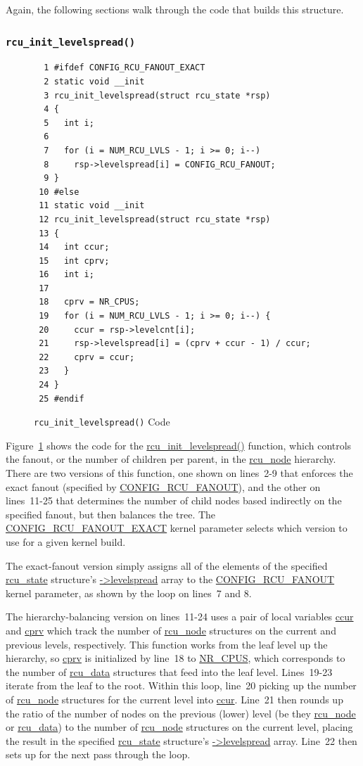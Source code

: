 Again, the following sections walk through the code that builds this
structure.

\subsubsection{\tt rcu\_init\_levelspread()}
\label{app:rcuimpl:rcutreewt:rcu-init-levelspread}

\begin{figure}[tbp]
{ \scriptsize
\begin{verbatim}
  1 #ifdef CONFIG_RCU_FANOUT_EXACT
  2 static void __init
  3 rcu_init_levelspread(struct rcu_state *rsp)
  4 {
  5   int i;
  6 
  7   for (i = NUM_RCU_LVLS - 1; i >= 0; i--)
  8     rsp->levelspread[i] = CONFIG_RCU_FANOUT;
  9 }
 10 #else
 11 static void __init
 12 rcu_init_levelspread(struct rcu_state *rsp)
 13 {
 14   int ccur;
 15   int cprv;
 16   int i;
 17 
 18   cprv = NR_CPUS;
 19   for (i = NUM_RCU_LVLS - 1; i >= 0; i--) {
 20     ccur = rsp->levelcnt[i];
 21     rsp->levelspread[i] = (cprv + ccur - 1) / ccur;
 22     cprv = ccur;
 23   }
 24 }
 25 #endif
\end{verbatim}
}
\caption{{\tt rcu\_init\_levelspread()} Code}
\label{fig:app:rcuimpl:rcutreewt:Code for rcu-init-levelspread}
\end{figure}

Figure~\ref{fig:app:rcuimpl:rcutreewt:Code for rcu-init-levelspread}
shows the code for the \url{rcu_init_levelspread()} function, which controls
the fanout, or the number of children per parent,
in the \url{rcu_node} hierarchy.
There are two versions of this function, one shown on lines~2-9 that
enforces the exact fanout (specified by \url{CONFIG_RCU_FANOUT}),
and the other on lines~11-25 that determines the number of child nodes
based indirectly on the specified fanout, but then balances the tree.
The \url{CONFIG_RCU_FANOUT_EXACT} kernel parameter selects which version
to use for a given kernel build.

The exact-fanout version simply assigns all of the elements of the
specified \url{rcu_state} structure's \url{->levelspread} array to
the \url{CONFIG_RCU_FANOUT} kernel parameter, as shown by the loop
on lines~7 and 8.

The hierarchy-balancing version on lines~11-24
uses a pair of local variables \url{ccur} and \url{cprv} which track
the number of \url{rcu_node} structures on the current and previous
levels, respectively.
This function works from the leaf level up the hierarchy, so \url{cprv}
is initialized by line~18 to \url{NR_CPUS}, which corresponds
to the number of \url{rcu_data} structures that feed into the leaf level.
Lines~19-23 iterate from the leaf to the root.
Within this loop, line~20 picking up
the number of \url{rcu_node} structures for the current level into
\url{ccur}.
Line~21 then rounds up the ratio of the number of nodes on the previous
(lower) level (be they \url{rcu_node} or \url{rcu_data})
to the number of \url{rcu_node} structures on the current
level, placing the result in the specified \url{rcu_state} structure's
\url{->levelspread} array.
Line~22 then sets up for the next pass through the loop.

